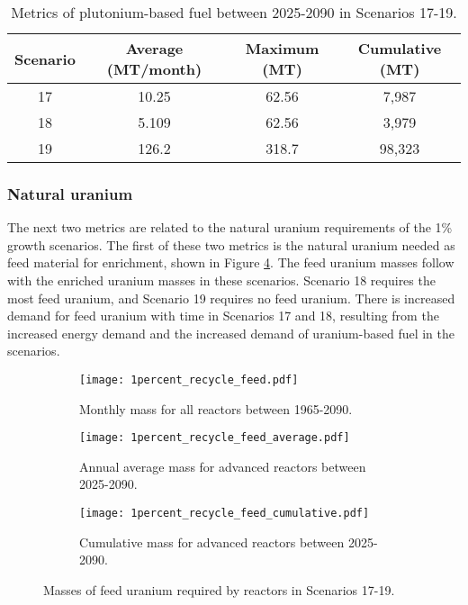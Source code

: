 \begin{table}[h!]
    \centering 
    \caption{Metrics of plutonium-based fuel between 2025-2090 in Scenarios 
    17-19.}
    \label{tab:s17-19_mox}
    \begin{tabular}{c c c c}
        \hline 
        Scenario & Average (MT/month) & Maximum (MT) & Cumulative (MT) \\
        \hline
        17 & 10.25 & 62.56 & 7,987\\
        18 & 5.109 & 62.56 & 3,979\\
        19 & 126.2 & 318.7 & 98,323\\
        \hline
    \end{tabular}
\end{table}

\subsubsection{Natural uranium}
The next two metrics are related to the natural uranium requirements of 
the 1\% growth scenarios. The first of these two metrics is the 
natural uranium needed as feed material for enrichment, shown in 
Figure \ref{fig:1percent_recycle_feed}. The feed uranium masses follow with 
the enriched uranium masses in these scenarios. Scenario 18 requires 
the most feed uranium, and Scenario 19 requires no feed uranium. 
There is increased demand for feed uranium with time in Scenarios 17 
and 18, resulting from the increased energy demand 
and the increased demand of uranium-based fuel in the scenarios.  

\begin{figure}[h!]
    \centering
    \begin{subfigure}[b]{0.45\textwidth}
        \centering
        \texttt{[image: 1percent\_recycle\_feed.pdf]}
        \caption{Monthly mass for all reactors 
        between 1965-2090.}
        \label{fig:1percent_recycle_all_feed}
    \end{subfigure}
    \hfill
    \begin{subfigure}[b]{0.45\textwidth}
        \centering
        \texttt{[image: 1percent\_recycle\_feed\_average.pdf]}
        \caption{Annual average mass for 
        advanced reactors between 2025-2090.}
        \label{fig:1percent_recycle_AR_feed}
    \end{subfigure}
    \begin{subfigure}[b]{0.45\textwidth}
        \centering
        \texttt{[image: 1percent\_recycle\_feed\_cumulative.pdf]}
        \caption{Cumulative mass for advanced reactors between 2025-2090.}
        \label{fig:1percent_recycle_feed_cumulative}
    \end{subfigure}
       \caption{Masses of feed uranium required by reactors
        in Scenarios 17-19.}
       \label{fig:1percent_recycle_feed}
\end{figure}

